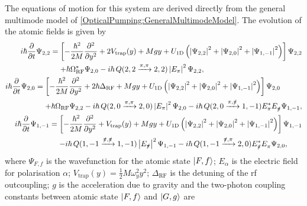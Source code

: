 The equations of motion for this system are derived directly from the general multimode model of \eqref{OpticalPumping:GeneralMultimodeModel}.  The evolution of the atomic fields is given by
\begin{subequations}
    \begin{align}
        \begin{split}
            i \hbar \frac{\partial}{\partial t} \Psi_{2,2} &= \left[- \frac{\hbar^2}{2 M} \frac{\partial^2}{\partial y^2} + 2 V_\text{trap}(y) + M g y + U_\text{1D}\left(\abs{\Psi_{2, 2}}^2 + \abs{\Psi_{2, 0}}^2 + \abs{\Psi_{1, -1}}^2\right)\right] \Psi_{2, 2} \\
            &\relphantom{=} + \hbar \Omega_\text{RF}^* \Psi_{2, 0} -i \hbar\, Q(2,2 \xrightarrow{\pi,\pi} 2, 2) \abs{E_\pi}^2 \Psi_{2, 2},
        \end{split}\\
        \begin{split}
            i \hbar \frac{\partial}{\partial t} \Psi_{2, 0} &= \left[ - \frac{\hbar^2}{2M} \frac{\partial^2}{\partial y^2} + 2 \hbar \Delta_\text{RF} + M g y + U_\text{1D}\left(\abs{\Psi_{2, 2}}^2 + \abs{\Psi_{2, 0}}^2 + \abs{\Psi_{1, -1}}^2\right)\right] \Psi_{2, 0} \\
            &\relphantom{=} + \hbar \Omega_\text{RF} \Psi_{2, 2}  - i \hbar \,Q({2, 0 \xrightarrow{\pi,\pi} 2, 0}) \abs{E_\pi}^2 \Psi_{2, 0} - i \hbar \,Q(2, 0 \xrightarrow{\pi,\pislash} 1, -1) E_\pi^* E_{\pislash}^{\phantom{*}} \Psi_{1, -1},
        \end{split}\\
        \begin{split}
            i \hbar \frac{\partial}{\partial t} \Psi_{1, -1} &= \left[ - \frac{\hbar^2}{2 M} \frac{\partial^2}{\partial y^2} + V_{\text{trap}}(y) + M g y + U_\text{1D} \left( \abs{\Psi_{2, 2}}^2 + \abs{\Psi_{2, 0}}^2 + \abs{\Psi_{1, -1}}^2\right)  \right] \Psi_{1, -1}\\
            &\relphantom{=} - i \hbar \,Q(1, -1 \xrightarrow{\pislash,\pislash} 1, -1) \abs{E_{\pislash}}^2 \Psi_{1, -1} - i \hbar \,Q(1, -1 \xrightarrow{\pislash,\pi} 2, 0) E_{\pislash}^* E_\pi^{\phantom{*}}\Psi_{2, 0},
        \end{split}
    \end{align}
\end{subequations}
where $\Psi_{F,f}$ is the wavefunction for the atomic state ${\left|F, f\right>}$; $E_\alpha$ is the electric field for polarisation $\alpha$; $V_\text{trap}(y) = \frac{1}{2} M \omega_y^2 y^2$; $\Delta_\text{RF}$ is the detuning of the rf outcoupling; $g$ is the acceleration due to gravity and the two-photon coupling constants between atomic state ${\left|F, f\right>}$ and ${\left|G, g\right>}$ are

